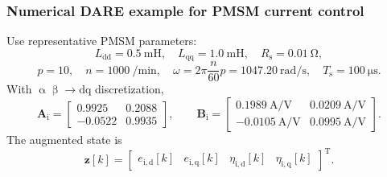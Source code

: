 \begin{frame}
	\frametitle{Numerical DARE example for PMSM current control}
	Use representative PMSM parameters:
	\begin{equation*}
		L_{\mathrm{dd}}=\SI{0.5}{\milli\henry},\quad
		L_{\mathrm{qq}}=\SI{1.0}{\milli\henry},\quad
		R_{\mathrm{s}}=\SI{0.01}{\ohm},
	\end{equation*}
	\begin{equation*}
		p=10,
		\quad
		n=\SI{1000}{\per\minute},
		\quad
		\omega=2\pi\frac{n}{60}p=\SI{1047.20}{\radian\per\second},
		\quad
		T_{\mathrm{s}}=\SI{100}{\micro\second}.
	\end{equation*}\pause%
	With $\upalpha\upbeta\rightarrow \mathrm{dq}$ discretization,
	\begin{equation*}
		\bm{A}_{\mathrm{i}}=\begin{bmatrix}
			\num{0.9925}  & \num{0.2088} \\[3mm]
			\num{-0.0522} & \num{0.9935}
		\end{bmatrix},
		\qquad \bm{B}_{\mathrm{i}}=\begin{bmatrix}
			\SI{0.1989}{\ampere\per\volt}  & \SI{0.0209}{\ampere\per\volt} \\[3mm]
			\SI{-0.0105}{\ampere\per\volt} & \SI{0.0995}{\ampere\per\volt}
		\end{bmatrix}.
	\end{equation*}\pause%
	The augmented state is
	\begin{equation*}
		\bm{z}[k]=\begin{bmatrix}
			e_{\mathrm{i},\mathrm{d}}[k]    & e_{\mathrm{i},\mathrm{q}}[k]    &
			\eta_{\mathrm{i},\mathrm{d}}[k] & \eta_{\mathrm{i},\mathrm{q}}[k]
		\end{bmatrix}^{\mathrm{T}}.
	\end{equation*}
\end{frame}


